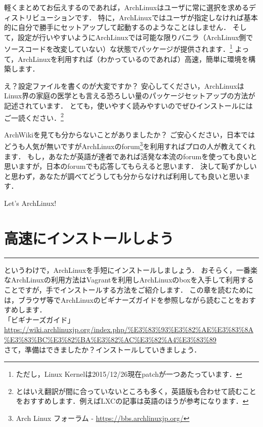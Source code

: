 \documentclass[b5j,twoside,openany]{jsbook}
\newcommand{\linesection}[1]{\newpage \section{#1} \hrule width 150mm \vspace{3em}}
\begin{document}
    軽くまとめてお伝えするのであれば，ArchLinuxはユーザに常に選択を求めるディストリビューションです．
    特に，ArchLinuxではユーザが指定しなければ基本的に自分で勝手にセットアップして起動するのようなことはしません．
    そして，設定が行いやすいようにArchLinuxでは可能な限りバニラ（ArchLinux側でソースコードを改変していない）な状態でパッケージが提供されます．\footnote{ただし，Linux Kernelは2015/12/26現在patchが一つあたっています．}
    よって，ArchLinuxを利用すれば（わかっているのであれば）高速，簡単に環境を構築します．

    え？設定ファイルを書くのが大変ですか？
    安心してください，ArchLinuxはLinux界の家庭の医学とも言える恐ろしい量のパッケージセットアップの方法が記述されています．
    とても，使いやすく読みやすいのでぜひインストールにはご一読ください．\footnote{とはいえ翻訳が間に合っていないところも多く，英語版も合わせて読むことをおすすめします．例えばLXCの記事は英語のほうが参考になります．}

    ArchWikiを見ても分からないことがありましたか？
    ご安心ください，日本ではどうも人気が無いですがArchLinuxのforum\footnote{Arch Linux フォーラム - \url{https://bbs.archlinuxjp.org/}}を利用すればプロの人が教えてくれます．
    もし，あなたが英語が達者であれば活発な本流のforumを使っても良いと思いますが，日本のforumでも応答してもらえると思います．
    決して恥ずかしいと思わず，あなたが調べてどうしても分からなければ利用しても良いと思います．

    Let's ArchLinux!

  \linesection{高速にインストールしよう}
    というわけで，ArchLinuxを手短にインストールしましょう．
    おそらく，一番楽なArchLinuxの利用方法はVagrantを利用しArchLinuxのboxを入手して利用することですが，手でインストールする方法をご紹介します．
    この章を読むためには，ブラウザ等でArchLinuxのビギナーズガイドを参照しながら読むことをおすすめします．\\

    「ビギナーズガイド」\\
    \url{https://wiki.archlinuxjp.org/index.php/%E3%83%93%E3%82%AE%E3%83%8A%E3%83%BC%E3%82%BA%E3%82%AC%E3%82%A4%E3%83%89}\\

    さて，準備はできましたか？インストールしていきましょう．
\end{document}
